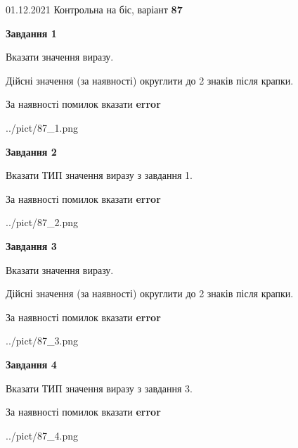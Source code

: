 \documentclass[11pt, ukrainian]{article}
\begin{document}
{01.12.2021 Контрольна на біс, варіант  \No \textbf { 87 }\par}
{
\begin {large}
{\begin {center}\textbf{Завдання 1}\end {center}}\par
Вказати значення виразу. \par
Дійсні значення (за наявності) округлити до 2 знаків після крапки. \par
За наявності помилок вказати \textbf{error}

\begin{center}
	{../pict/87_1.png}
\end{center}
\newpage

{\begin {center}\textbf{Завдання 2}\end {center}}\par
Вказати ТИП значення виразу з завдання 1. \par
За наявності помилок вказати \textbf{error}

\begin{center}
	{../pict/87_2.png}
\end{center}
\newpage

{\begin {center}\textbf{Завдання 3}\end {center}}\par
Вказати значення виразу. \par
Дійсні значення (за наявності) округлити до 2 знаків після крапки. \par
За наявності помилок вказати \textbf{error}

\begin{center}
	{../pict/87_3.png}
\end{center}
\newpage

{\begin {center}\textbf{Завдання 4}\end {center}}\par
Вказати ТИП значення виразу з завдання 3. \par
За наявності помилок вказати \textbf{error}

\begin{center}
	{../pict/87_4.png}
\end{center}
\newpage


\end{large}}
\end{document}
